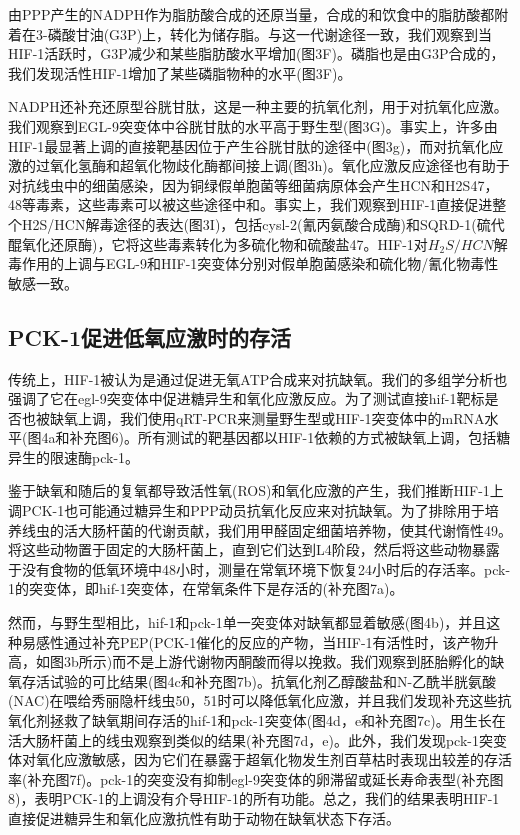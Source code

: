 \documentclass{ctexart}
\begin{document}
    由PPP产生的NADPH作为脂肪酸合成的还原当量，合成的和饮食中的脂肪酸都附着在3-磷酸甘油(G3P)上，转化为储存脂。与这一代谢途径一致，我们观察到当HIF-1活跃时，G3P减少和某些脂肪酸水平增加(图3F)。磷脂也是由G3P合成的，我们发现活性HIF-1增加了某些磷脂物种的水平(图3F)。

    NADPH还补充还原型谷胱甘肽，这是一种主要的抗氧化剂，用于对抗氧化应激。我们观察到EGL-9突变体中谷胱甘肽的水平高于野生型(图3G)。事实上，许多由HIF-1最显著上调的直接靶基因位于产生谷胱甘肽的途径中(图3g)，而对抗氧化应激的过氧化氢酶和超氧化物歧化酶都间接上调(图3h)。氧化应激反应途径也有助于对抗线虫中的细菌感染，因为铜绿假单胞菌等细菌病原体会产生HCN和H2S47，48等毒素，这些毒素可以被这些途径中和。事实上，我们观察到HIF-1直接促进整个H2S/HCN解毒途径的表达(图3I)，包括cysl-2(氰丙氨酸合成酶)和SQRD-1(硫代醌氧化还原酶)，它将这些毒素转化为多硫化物和硫酸盐47。HIF-1对$H_{2}S/HCN$解毒作用的上调与EGL-9和HIF-1突变体分别对假单胞菌感染和硫化物/氰化物毒性敏感一致。

    \subsection{PCK-1促进低氧应激时的存活}

    传统上，HIF-1被认为是通过促进无氧ATP合成来对抗缺氧。我们的多组学分析也强调了它在egl-9突变体中促进糖异生和氧化应激反应。为了测试直接hif-1靶标是否也被缺氧上调，我们使用qRT-PCR来测量野生型或HIF-1突变体中的mRNA水平(图4a和补充图6)。所有测试的靶基因都以HIF-1依赖的方式被缺氧上调，包括糖异生的限速酶pck-1。

    鉴于缺氧和随后的复氧都导致活性氧(ROS)和氧化应激的产生，我们推断HIF-1上调PCK-1也可能通过糖异生和PPP动员抗氧化反应来对抗缺氧。为了排除用于培养线虫的活大肠杆菌的代谢贡献，我们用甲醛固定细菌培养物，使其代谢惰性49。将这些动物置于固定的大肠杆菌上，直到它们达到L4阶段，然后将这些动物暴露于没有食物的低氧环境中48小时，测量在常氧环境下恢复24小时后的存活率。pck-1的突变体，即hif-1突变体，在常氧条件下是存活的(补充图7a)。

    然而，与野生型相比，hif-1和pck-1单一突变体对缺氧都显着敏感(图4b)，并且这种易感性通过补充PEP(PCK-1催化的反应的产物，当HIF-1有活性时，该产物升高，如图3b所示)而不是上游代谢物丙酮酸而得以挽救。我们观察到胚胎孵化的缺氧存活试验的可比结果(图4c和补充图7b)。抗氧化剂乙醇酸盐和N-乙酰半胱氨酸(NAC)在喂给秀丽隐杆线虫50，51时可以降低氧化应激，并且我们发现补充这些抗氧化剂拯救了缺氧期间存活的hif-1和pck-1突变体(图4d，e和补充图7c)。用生长在活大肠杆菌上的线虫观察到类似的结果(补充图7d，e)。此外，我们发现pck-1突变体对氧化应激敏感，因为它们在暴露于超氧化物发生剂百草枯时表现出较差的存活率(补充图7f)。pck-1的突变没有抑制egl-9突变体的卵滞留或延长寿命表型(补充图8)，表明PCK-1的上调没有介导HIF-1的所有功能。总之，我们的结果表明HIF-1直接促进糖异生和氧化应激抗性有助于动物在缺氧状态下存活。
\end{document}
